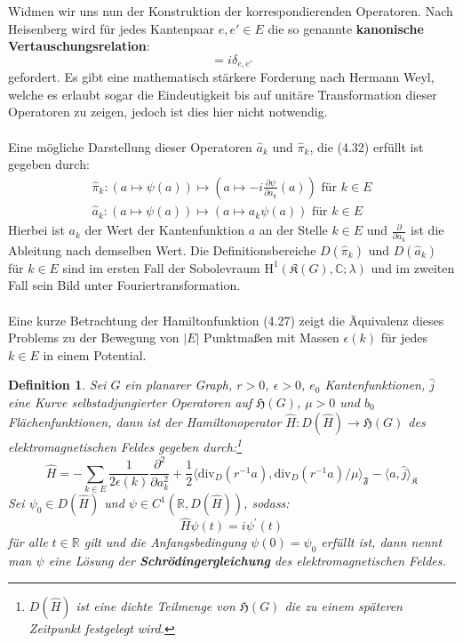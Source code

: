 \documentclass[11pt,a4paper,leqno]{report}
\newtheorem{definition}[theorem]{Definition}
\numberwithin{equation}{chapter}
\begin{document}
\noindent
Widmen wir uns nun der Konstruktion der korrespondierenden Operatoren. Nach Heisenberg wird f\"ur jedes Kantenpaar $e,e'\in E$ die so genannte \textbf{kanonische Vertauschungsrelation}:
\begin{equation}
	[\hat{a}(e), \hat{\pi}(e')] = i\delta_{e, e'}
\end{equation}
gefordert. Es gibt eine mathematisch st\"arkere Forderung nach Hermann Weyl, welche es erlaubt sogar die Eindeutigkeit bis auf unit\"are Transformation dieser Operatoren zu zeigen, jedoch ist dies hier nicht notwendig.\\
\\
Eine m\"ogliche Darstellung dieser Operatoren $\hat{a}_k$ und $\hat{\pi}_k$, die (4.32) erf\"ullt ist gegeben durch:
\begin{align}
	\hat{\pi}_k:(a\mapsto\psi(a)) \mapsto (a\mapsto -i\frac{\partial\psi}{\partial a_k}(a))\text{  f\"ur }k\in E\\
	\hat{a}_k:(a\mapsto\psi(a)) \mapsto (a\mapsto a_k\psi(a))\text{  f\"ur }k\in E
\end{align}
\noindent
Hierbei ist $a_k$ der Wert der Kantenfunktion $a$ an der Stelle $k\in E$ und $\frac{\partial}{\partial a_k}$ ist die Ableitung nach demselben Wert. 
Die Definitionsbereiche $D(\hat{\pi}_k)$ und $D(\hat{a}_k)$ f\"ur $k\in E$ sind im ersten Fall der Sobolevraum $\text{H}^1(\mathfrak{K}(G),\mathbb{C};\lambda)$ und im zweiten Fall sein Bild unter Fouriertransformation.
\\
\\
Eine kurze Betrachtung der Hamiltonfunktion (4.27) zeigt die \"Aquivalenz dieses Problems zu der Bewegung von $|E|$ Punktma\ss{}en mit Massen $\epsilon(k)$ f\"ur jedes $k\in E$ in einem Potential. 
\begin{definition}
	Sei $G$ ein planarer Graph, $r>0$, $\epsilon>0$, $e_0$ Kantenfunktionen, $\hat{j}$ eine Kurve selbstadjungierter Operatoren auf $\mathfrak{H}(G)$, $\mu>0$ und $b_0$ Fl\"achenfunktionen, dann ist der Hamiltonoperator $\hat{H}:D(\hat{H})\rightarrow \mathfrak{H}(G)$ des elektromagnetischen Feldes gegeben durch:\footnote{$D(\hat{H})$ ist eine dichte Teilmenge von $\mathfrak{H}(G)$ die zu einem sp\"ateren Zeitpunkt festgelegt wird.}
	\begin{equation}
	\hat{H}=-\sum_{k\in E}\frac{1}{2\epsilon(k)}\frac{\partial^2}{\partial a_k^2} + \frac{1}{2}\langle \text{div}_D(r^{-1}a), \text{div}_D(r^{-1}a)/\mu\rangle_{\mathfrak{F}} - \langle a, \hat{j}\rangle_{\mathfrak{K}}
	\end{equation}
	Sei $\psi_0\in D(\hat{H})$ und $\psi\in C^1(\mathbb{R}, D(\hat{H}))$, sodass:
\begin{equation}
\hat{H}\psi(t) = i\psi^\prime(t)
\end{equation}
f\"ur alle $t\in\mathbb{R}$ gilt und die Anfangsbedingung $\psi(0)=\psi_0$ erf\"ullt ist, dann nennt man $\psi$ eine L\"osung der
\textbf{Schr\"odingergleichung} des elektromagnetischen Feldes.
\end{definition}
\end{document}
